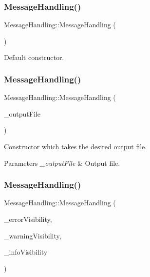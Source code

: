 \subsubsection{\texorpdfstring{Message\+Handling()}{MessageHandling()}\hspace{0.1cm}{\footnotesize\ttfamily [1/5]}}
{\footnotesize\ttfamily Message\+Handling\+::\+Message\+Handling (\begin{DoxyParamCaption}{ }\end{DoxyParamCaption})}

Default constructor. \mbox{\label{class_message_handling_af5fea91daefd158b856a091fd5dbdae4}} 
\subsubsection{\texorpdfstring{Message\+Handling()}{MessageHandling()}\hspace{0.1cm}{\footnotesize\ttfamily [2/5]}}
{\footnotesize\ttfamily Message\+Handling\+::\+Message\+Handling (\begin{DoxyParamCaption}\item[{F\+I\+LE $\ast$}]{\+\_\+output\+File }\end{DoxyParamCaption})}

Constructor which takes the desired output file. 
\begin{DoxyParams}{Parameters}
{\em \+\_\+output\+File} & Output file. \\
\hline
\end{DoxyParams}
\mbox{\label{class_message_handling_a65bf868c3aab4d7a29f9d61f235b65e4}} 
\subsubsection{\texorpdfstring{Message\+Handling()}{MessageHandling()}\hspace{0.1cm}{\footnotesize\ttfamily [3/5]}}
{\footnotesize\ttfamily Message\+Handling\+::\+Message\+Handling (\begin{DoxyParamCaption}\item[{\hyperlink{_types_8hpp_a36503475bb1fea0a7fd7087259ee63c1}{Visibility\+Status}}]{\+\_\+error\+Visibility,  }\item[{\hyperlink{_types_8hpp_a36503475bb1fea0a7fd7087259ee63c1}{Visibility\+Status}}]{\+\_\+warning\+Visibility,  }\item[{\hyperlink{_types_8hpp_a36503475bb1fea0a7fd7087259ee63c1}{Visibility\+Status}}]{\+\_\+info\+Visibility }\end{DoxyParamCaption})}

